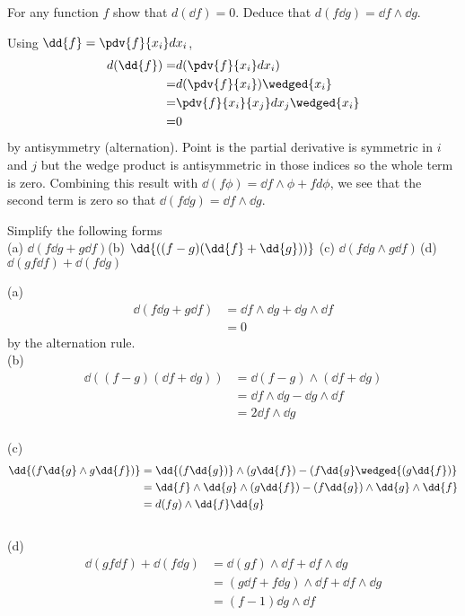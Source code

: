 \begin{problem}{3}
  For any function \(f\) show that \(d{(\dd{f})}=0\). Deduce that \(d{(f\dd{g})}=\dd{f}\wedge\dd{g}\).
\end{problem}
\begin{sol}
  Using \(\dd{f}=\pdv{f}{x_i}d{x_i}\),
  \begin{align}
    d{(\dd{f})}=&d{(\pdv{f}{x_i}d{x_i})}\\
    =&d{(\pdv{f}{x_i})}\wedged{x_i}\\
    =&\pdv{f}{x_i}{x_j}d{x_j}\wedged{x_i}\\
    =& 0
  \end{align}
  by antisymmetry (alternation). Point is the partial derivative is symmetric in \(i \) and \(j\) but the wedge product is antisymmetric in those indices so the whole term is zero. Combining this result with \(\dd{(f\phi )}=\dd{f}\wedge\phi+fd{\phi}\), we see that the second term is zero so that \(\dd{(f\dd{g})}=\dd{f}\wedge\dd{g}\).
\end{sol}

\begin{problem}{4}
  Simplify the following forms \\
  (a) \(\dd{(f\dd{g}+g\dd{f})}\)\quad\quad (b) \(\dd{((f-g)(\dd{f}+\dd{g}))}\\\)
  (c) \(\dd{(f\dd{g}\wedge g\dd{f})}\)\quad\quad \,(d) \(\dd{(gf\dd{f})}+\dd{(f\dd{g})}\)
\end{problem}
\begin{sol}
  (a) \begin{align}
        \dd{(f\dd{g}+g\dd{f})}&=\dd{f}\wedge\dd{g}+\dd{g}\wedge\dd{f}\\
        &=0
      \end{align}
      by the alternation rule.\\

  (b) \begin{align}
    \dd{((f-g)(\dd{f}+\dd{g}))}&=\dd{(f-g)}\wedge(\dd{f}+\dd{g})\\
    &=\dd{f}\wedge\dd{g}-\dd{g}\wedge\dd{f}\\
    &=2\dd{f}\wedge\dd{g}
  \end{align}\\

  (c) \begin{align}
    \dd{(f\dd{g}\wedge g\dd{f})}&=\dd{(f\dd{g})}\wedge(g\dd{f})-(f\dd{g}\wedged{(g\dd{f})}\\
    &=\dd{f}\wedge\dd{g}\wedge(g\dd{f})-(f\dd{g})\wedge\dd{g}\wedge\dd{f}\\
    &=d{(fg)}\wedge\dd{f}\dd{g}
  \end{align}\\

  (d) \begin{align}
    \dd{(gf\dd{f})}+\dd{(f\dd{g})}&=\dd{(gf)}\wedge\dd{f}+\dd{f}\wedge\dd{g}\\
    &=(g\dd{f}+f\dd{g})\wedge\dd{f}+\dd{f}\wedge\dd{g}\\
    &=(f-1)\dd{g}\wedge\dd{f}
  \end{align}
\end{sol}

